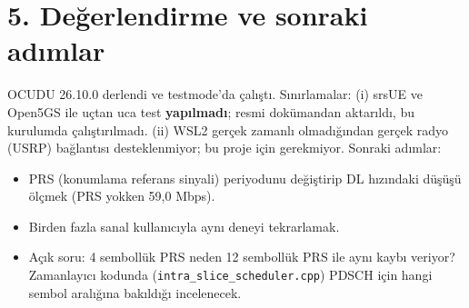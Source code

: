 \documentclass[10.5pt,a4paper]{article}
\begin{document}
\section*{5. Değerlendirme ve sonraki adımlar}
OCUDU 26.10.0 derlendi ve testmode'da çalıştı. Sınırlamalar: (i) srsUE ve Open5GS ile uçtan uca test \textbf{yapılmadı}; resmi dokümandan aktarıldı, bu kurulumda çalıştırılmadı. (ii) WSL2 gerçek zamanlı olmadığından gerçek radyo (USRP) bağlantısı desteklenmiyor; bu proje için gerekmiyor. Sonraki adımlar:
\begin{itemize}
\item PRS (konumlama referans sinyali) periyodunu değiştirip DL hızındaki düşüşü ölçmek (PRS yokken 59,0 Mbps).
\item Birden fazla sanal kullanıcıyla aynı deneyi tekrarlamak.
\item Açık soru: 4 sembollük PRS neden 12 sembollük PRS ile aynı kaybı veriyor? Zamanlayıcı kodunda (\texttt{intra\_slice\_scheduler.cpp}) PDSCH için hangi sembol aralığına bakıldığı incelenecek.
\end{itemize}
\end{document}
